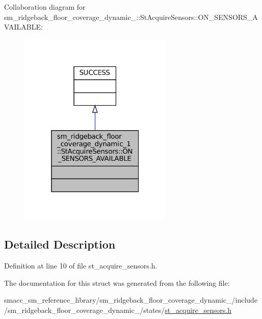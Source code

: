 Collaboration diagram for sm\+\_\+ridgeback\+\_\+floor\+\_\+coverage\+\_\+dynamic\+\_\+:\+:St\+Acquire\+Sensors\+:\+:O\+N\+\_\+\+S\+E\+N\+S\+O\+R\+S\+\_\+\+A\+V\+A\+I\+L\+A\+B\+LE\+:
\nopagebreak
\begin{figure}[H]
\begin{center}
\leavevmode
\includegraphics[width=208pt]{structsm__ridgeback__floor__coverage__dynamic__1_1_1StAcquireSensors_1_1ON__SENSORS__AVAILABLE__coll__graph}
\end{center}
\end{figure}


\subsection{Detailed Description}


Definition at line 10 of file st\+\_\+acquire\+\_\+sensors.\+h.



The documentation for this struct was generated from the following file\+:\begin{DoxyCompactItemize}
\item 
smacc\+\_\+sm\+\_\+reference\+\_\+library/sm\+\_\+ridgeback\+\_\+floor\+\_\+coverage\+\_\+dynamic\+\_/include/sm\+\_\+ridgeback\+\_\+floor\+\_\+coverage\+\_\+dynamic\+\_/states/\hyperlink{sm__ridgeback__floor__coverage__dynamic__1_2include_2sm__ridgeback__floor__coverage__dynamic__1_df035bf5d633a4b0084571c4e866bf36}{st\+\_\+acquire\+\_\+sensors.\+h}\end{DoxyCompactItemize}
